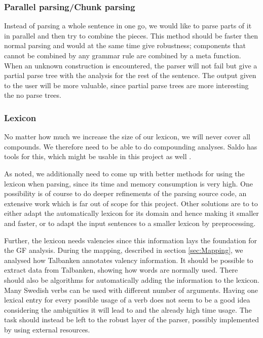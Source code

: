 \documentclass{report}
\begin{document}
\subsubsection{Parallel parsing/Chunk parsing}
Instead of parsing a whole sentence in one go, we would like to
parse parts of it in parallel and then try to combine the pieces.
This method should be faster then normal parsing and would
at the same time give robustness;
components that cannot be combined by any grammar rule are combined by a 
meta function. When an unknown construction is encountered, the parser
will not fail but give a partial parse tree with the analysis for the rest of
the sentence.
The output given to the user will be more valuable, since partial parse
trees are more interesting the no parse trees.

\subsubsection{Lexicon}
\label{sec:futureValency}
No matter how much we increase the size of our lexicon, we will
never cover all compounds. We therefore need to be able to do
compounding analyses. Saldo has tools for this, which might be usable
in this project as well \cite{}.

As noted, we additionally need to come up with better methods for using the lexicon when
parsing, since its time and memory consumption is very high.
One possibility is of course to do 
deeper refinements of the parsing source code, an extensive work which is far out of scope
for this project. Other solutions are to to either
adapt the automatically lexicon for its domain and hence making it smaller and
faster, or to adapt the input sentences to a smaller lexicon by preprocessing.

Further, the lexicon needs valencies since this information lays the
foundation for the GF analysis. 
During the mapping, described in section \ref{sec:Mapping}, we analysed how Talbanken
annotates valency information. It should be possible to %
extract data from Talbanken,
showing how words are normally used. There should also be algorithms for
automatically adding the information to the lexicon. \\
Many Swedish verbs can be used with different number of arguments.
Having one lexical entry for every possible usage of a verb
does not seem to be a good idea considering
the ambiguities it will lead to and the already high time usage.
The task should instead be left to the robust layer of the parser, possibly
implemented by using external resources.
\end{document}
